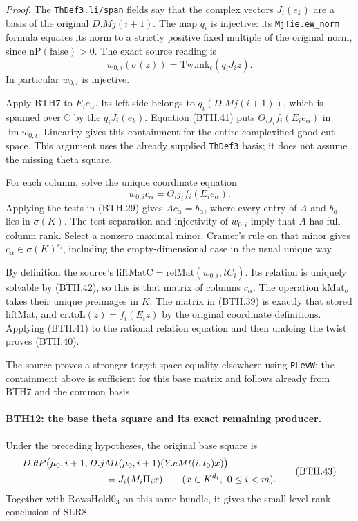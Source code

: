 \emph{Proof.}
The \texttt{Th\allowbreak Def3.li/span} fields say that the complex
vectors \(J_i(e_k)\) are a basis of the original
\(D.Mj(i+1)\).  The map \(q_i\) is injective:
its \texttt{Mj\allowbreak Tie.e\allowbreak W\_\allowbreak norm} formula equates its norm
to a strictly positive fixed multiple of the original
norm, since \(\mathrm{nP}(\mathrm{false})>0\).
The exact source reading is
\[
       w_{0,i}(\sigma(z))
                =\mathrm{Tw.mk}_\epsilon(q_iJ_i z).             \tag{BTH.41}
\]
In particular \(w_{0,i}\) is injective.

Apply BTH7 to \(E_i e_\alpha\).
Its left side belongs to \(q_i(D.Mj(i+1))\), which is
spanned over \(\mathbb C\) by the \(q_iJ_i(e_k)\).
Equation (BTH.41) puts
\(\Theta_i j_i f_i(E_i e_\alpha)\) in
\(\operatorname{im}w_{0,i}\).  Linearity gives this
containment for the entire complexified good-cut
space.  This argument uses the already supplied
\texttt{Th\allowbreak Def3} basis; it does not assume the missing
theta square.

For each column, solve the unique coordinate equation
\[
       w_{0,i}c_\alpha=\Theta_i j_i f_i(E_i e_\alpha).
 \tag{BTH.42}
\]
Applying the tests in (BTH.29) gives \(Ac_\alpha=b_\alpha\),
where every entry of \(A\) and \(b_\alpha\) lies in
\(\sigma(K)\).  The test separation and injectivity of
\(w_{0,i}\) imply that \(A\) has full column rank.
Select a nonzero maximal minor.  Cramer's rule on that
minor gives \(c_\alpha\in\sigma(K)^{r_i}\), including
the empty-dimensional case in the usual unique way.

By definition the source's
\(\mathrm{liftMatC}=\mathrm{relMat}(w_{0,i},tC_i)\).
Its relation is uniquely solvable by (BTH.42), so this
is that matrix of columns \(c_\alpha\).  The operation
\(\mathrm{kMat}_\sigma\) takes their unique preimages
in \(K\).  The matrix in (BTH.39) is exactly that
stored \(\mathrm{liftMat}\), and
\(\mathrm{cr.toL}(z)=f_i(E_i z)\) by the original
coordinate definitions.  Applying (BTH.41) to the
rational relation equation and then undoing the twist
proves (BTH.40).

The source proves a stronger target-space equality
elsewhere using \texttt{PLev\allowbreak W}; the containment above
is sufficient for this base matrix and follows
already from BTH7 and the common basis.

\paragraph{BTH12: the base theta square and its exact remaining producer.}
\label{claim:BTH12}
Under the preceding hypotheses, the original base square is
\[
 \begin{split}
 &D.\theta P\bigl(\mu_0,i+1,
            D.jMt(\mu_0,i+1)(Y.eMt(i,t_0)x)\bigr)\\
 &\hspace{30mm}=J_i(M_i\Pi_i x)
       \qquad(x\in K^{d_i},\ 0\le i<m).
 \end{split}                                                    \tag{BTH.43}
\]
Together with \(\mathrm{RowsHold0}_3\) on this same
bundle, it gives the small-level rank conclusion of SLR8.

